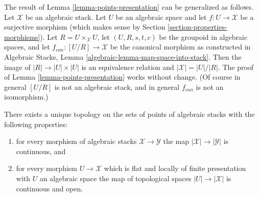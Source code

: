 \begin{remark}
\label{remark-more-general-presentation}
The result of
Lemma \ref{lemma-points-presentation}
can be generalized as follows.
Let $\mathcal{X}$ be an algebraic stack.
Let $U$ be an algebraic space and let $f : U \to \mathcal{X}$ be a surjective
morphism (which makes sense by
Section \ref{section-properties-morphisms}).
Let $R = U \times_\mathcal{X} U$, let $(U, R, s, t, c)$ be the groupoid
in algebraic spaces, and let $f_{can} : [U/R] \to \mathcal{X}$ be the
canonical morphism as constructed in
Algebraic Stacks, Lemma \ref{algebraic-lemma-map-space-into-stack}.
Then the image of $|R| \to |U| \times |U|$ is an equivalence relation
and $|\mathcal{X}| = |U|/|R|$. The proof of
Lemma \ref{lemma-points-presentation}
works without change. (Of course in general $[U/R]$ is not an algebraic
stack, and in general $f_{can}$ is not an isomorphism.)
\end{remark}

\begin{lemma}
\label{lemma-topology-points}
There exists a unique topology on the sets of points
of algebraic stacks with the following properties:
\begin{enumerate}
\item for every morphism of algebraic stacks $\mathcal{X} \to \mathcal{Y}$
the map $|\mathcal{X}| \to |\mathcal{Y}|$ is continuous, and
\item for every morphism $U \to \mathcal{X}$ which is flat and locally
of finite presentation with $U$ an algebraic space
the map of topological spaces $|U| \to |\mathcal{X}|$ is continuous and open.
\end{enumerate}
\end{lemma}

